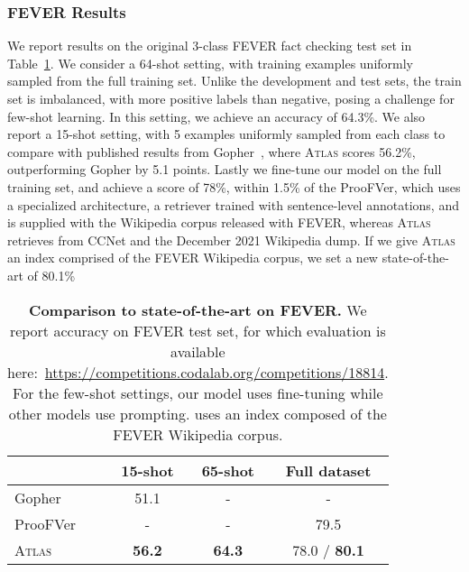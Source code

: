 \documentclass[10pt]{article} \usepackage[preprint]{tmlr}
\newcommand{\Atlas}{\textsc{Atlas}}
\begin{document}
\subsubsection{FEVER Results}
We report results on the original 3-class FEVER fact checking test set in Table~\ref{tab:fever}.
We consider a 64-shot setting, with training examples uniformly sampled from the full training set.
Unlike the development and test sets, the train set is imbalanced, with more positive labels than negative, posing a challenge for few-shot learning.
In this setting, we achieve an accuracy of 64.3\%.
We also report a 15-shot setting, with 5 examples uniformly sampled from each class to compare with published results from  Gopher~\citep{rae2021goepher}, where \Atlas{} scores 56.2\%, outperforming Gopher by 5.1 points.
Lastly we fine-tune our model on the full training set, and achieve a score of 78\%, within 1.5\% of the ProoFVer, which uses a specialized architecture, a retriever trained with sentence-level annotations, and is supplied with the Wikipedia corpus released with FEVER, whereas \Atlas{} retrieves from CCNet and the December 2021 Wikipedia dump. 
If we give \Atlas{} an index comprised of the FEVER Wikipedia corpus, we set a new state-of-the-art of 80.1\%   


\begin{table}[t]
  \centering
  \caption{\textbf{Comparison to state-of-the-art on FEVER.} We report accuracy on FEVER test set, for which evaluation is available here:~\small\url{https://competitions.codalab.org/competitions/18814}\normalsize.
    For the few-shot settings, our model uses fine-tuning while other models use prompting. uses an index composed of the FEVER Wikipedia corpus.
   }
  \label{table:fever}
  \vspace{0.5em}
  \begin{tabular}{lccc}
    \toprule
    & 15-shot & 65-shot & Full dataset\\
    \midrule
    Gopher\small~\citep{rae2021goepher}\normalsize & 51.1 &- &- \\
    ProoFVer\small~\citep{krishna2021proofver}\normalsize& - &- & 79.5 \\
    \Atlas{} & \textbf{56.2} & \textbf{64.3} & 78.0 / \textbf{80.1} \\
    \bottomrule
  \end{tabular}
\label{tab:fever}
\end{table}
\end{document}
